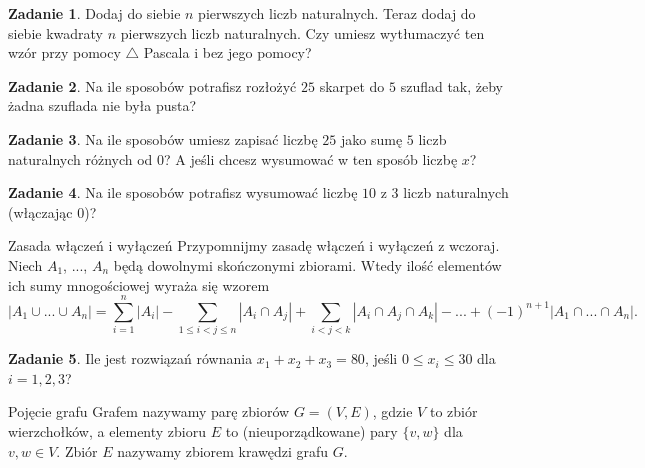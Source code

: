 \documentclass{uoom}
\theoremstyle{definition}
\newtheorem{zadd}{Zadanie}
\newenvironment{zadanie}{
  \begin{zadd}
  }
  {
    \end{zadd}\vspace{\ooodstep}
  }
\begin{document}
\begin{zadanie}
  Dodaj do siebie $n$ pierwszych liczb naturalnych. Teraz dodaj do siebie kwadraty $n$ pierwszych liczb naturalnych. Czy umiesz wytłumaczyć ten wzór przy pomocy $\triangle$ Pascala i bez jego pomocy?
\end{zadanie}


\begin{zadanie}
  Na ile sposobów potrafisz rozłożyć $25$ skarpet do $5$ szuflad tak, żeby żadna szuflada nie była pusta?
\end{zadanie}

\begin{zadanie}
  Na ile sposobów umiesz zapisać liczbę $25$ jako sumę $5$ liczb naturalnych różnych od $0$? A jeśli chcesz wysumować w ten sposób liczbę $x$? 
\end{zadanie}

\begin{zadanie}
  Na ile sposobów potrafisz wysumować liczbę $10$ z $3$ liczb naturalnych (włączając $0$)? 
\end{zadanie}

\begin{mybox}{Zasada włączeń i wyłączeń}
  Przypomnijmy zasadę włączeń i wyłączeń z wczoraj. Niech $A_1$, ..., $A_n$ będą dowolnymi skończonymi zbiorami. Wtedy ilość elementów ich sumy mnogościowej wyraża się wzorem
  $$|A_1\cup...\cup A_n|=\sum_{i=1}^n|A_i|-\sum_{1\leq i< j\leq n}|A_i\cap A_j|+\sum_{i<j<k}|A_i\cap A_j\cap A_k|-...+(-1)^{n+1}|A_1\cap...\cap A_n|.$$
\end{mybox}
  
\begin{zadanie}
  Ile jest rozwiązań równania $x_1+x_2+x_3=80$, jeśli $0\leq x_i\leq 30$ dla $i=1,2,3$?
\end{zadanie}

\begin{mybox}{Pojęcie grafu}
  Grafem nazywamy parę zbiorów $G=(V, E)$, gdzie $V$ to zbiór wierzchołków, a elementy zbioru $E$ to (nieuporządkowane) pary $\{v, w\}$ dla $v,w\in V$. Zbiór $E$ nazywamy zbiorem krawędzi grafu $G$.
\end{mybox}
\end{document}
